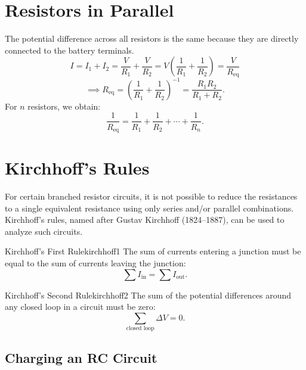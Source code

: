 \section{Resistors in Parallel}

The potential difference across all resistors is the same because they are directly connected to the battery terminals.
\[
    I = I_1 + I_2 = \frac{V}{R_1} + \frac{V}{R_2} = V\left(\frac{1}{R_1}+\frac{1}{R_2}\right) = \frac{V}{R_{\text{eq}}}
\]
\[
    \implies R_{\text{eq}} = {\left(\frac{1}{R_1}+\frac{1}{R_2}\right)}^{-1} = \frac{R_1R_2}{R_1 + R_2}.
\]
For $n$ resistors, we obtain:
\[
    \frac{1}{R_{\text{eq}}} = \frac{1}{R_1} + \frac{1}{R_2} + \cdots + \frac{1}{R_n}.
\]


\section{Kirchhoff’s Rules}

For certain branched resistor circuits, it is not possible to reduce the resistances to a single equivalent resistance using only series and/or parallel combinations.
Kirchhoff’s rules, named after Gustav Kirchhoff (1824–1887), can be used to analyze such circuits.

\begin{theorem}{Kirchhoff’s First Rule}{kirchhoff1}
    The sum of currents entering a junction must be equal to the sum of currents leaving the junction:
    \[
        \sum I_{\text{in}} = \sum I_{\text{out}}.
    \]
\end{theorem}

\begin{theorem}{Kirchhoff’s Second Rule}{kirchhoff2}
    The sum of the potential differences around any closed loop in a circuit must be zero:
    \[
        \sum_{\text{closed loop}} \Delta V = 0.
    \]
\end{theorem}


\subsection{Charging an RC Circuit}

